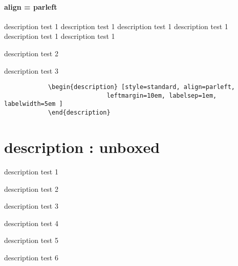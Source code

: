 			\paragraph{ align = parleft }
			\begin{description}	[
							style=standard, 
							align=parleft,
							leftmargin=10em,
							labelsep=1em,
							labelwidth=5em
							]
			\item	[description1]		description test 1 description test 1 description test 1 description test 1 description test 1 description test 1
			\item	[description]		description test 2
			\item	[descrip]			description test 3
			\end{description}

		\begin{mdframed}[style=code_document, frametitle={code}]
			\begin{verbatim}
			\begin{description}	[style=standard, align=parleft,
							leftmargin=10em, labelsep=1em, labelwidth=5em ]
			\end{description}
			\end{verbatim}
		\end{mdframed}


	\section{description : unboxed}
			\begin{description}[style=unboxed]
			\setlength\topsep{0.0em}
			\setlength\itemsep{-1.0em}
			\setlength\leftmargin{12cm}
			\setlength{}
			\setlength{}


			\item	[description 1]	description test 1
			\item	[description]		description test 2
			\item	[descrip]			description test 3
			\item	[descrip]			description test 4
			\item	[desc]			description test 5
			\item	[d]				description test 6
			\end{description}


